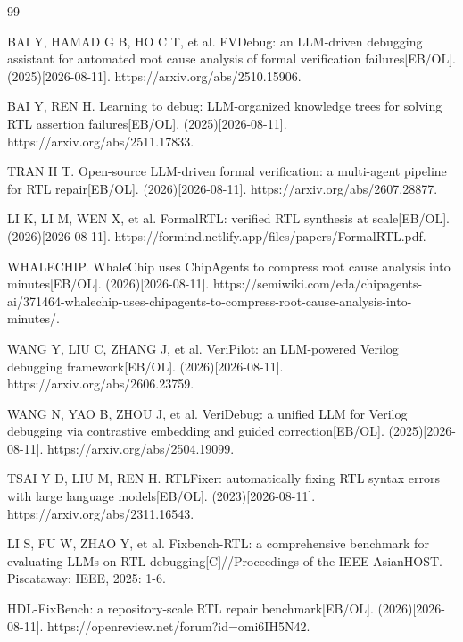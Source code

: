 \documentclass[twocolumn,10pt]{ctexart}
\begin{document}
\begin{thebibliography}{99}
\fontsize{8}{10}\selectfont
\setlength{\itemsep}{0pt}

 BAI Y, HAMAD G B, HO C T, et al. FVDebug: an LLM-driven debugging assistant for automated root cause analysis of formal verification failures[EB/OL]. (2025)[2026-08-11]. https://arxiv.org/abs/2510.15906.

 BAI Y, REN H. Learning to debug: LLM-organized knowledge trees for solving RTL assertion failures[EB/OL]. (2025)[2026-08-11]. https://arxiv.org/abs/2511.17833.

 TRAN H T. Open-source LLM-driven formal verification: a multi-agent pipeline for RTL repair[EB/OL]. (2026)[2026-08-11]. https://arxiv.org/abs/2607.28877.

 LI K, LI M, WEN X, et al. FormalRTL: verified RTL synthesis at scale[EB/OL]. (2026)[2026-08-11]. https://formind.netlify.app/files/papers/FormalRTL.pdf.

 WHALECHIP. WhaleChip uses ChipAgents to compress root cause analysis into minutes[EB/OL]. (2026)[2026-08-11]. https://semiwiki.com/eda/chipagents-ai/371464-whalechip-uses-chipagents-to-compress-root-cause-analysis-into-minutes/.

 WANG Y, LIU C, ZHANG J, et al. VeriPilot: an LLM-powered Verilog debugging framework[EB/OL]. (2026)[2026-08-11]. https://arxiv.org/abs/2606.23759.

 WANG N, YAO B, ZHOU J, et al. VeriDebug: a unified LLM for Verilog debugging via contrastive embedding and guided correction[EB/OL]. (2025)[2026-08-11]. https://arxiv.org/abs/2504.19099.

 TSAI Y D, LIU M, REN H. RTLFixer: automatically fixing RTL syntax errors with large language models[EB/OL]. (2023)[2026-08-11]. https://arxiv.org/abs/2311.16543.

 LI S, FU W, ZHAO Y, et al. Fixbench-RTL: a comprehensive benchmark for evaluating LLMs on RTL debugging[C]//Proceedings of the IEEE AsianHOST. Piscataway: IEEE, 2025: 1-6.

 HDL-FixBench: a repository-scale RTL repair benchmark[EB/OL]. (2026)[2026-08-11]. https://openreview.net/forum?id=omi6IH5N42.


\end{thebibliography}
\end{document}
